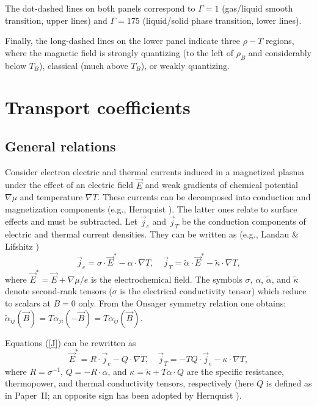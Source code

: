 \documentclass{aa}
\newcommand{\beq}{\begin{equation}}
\newcommand{\eeq}{\end{equation}}
\begin{document}
The dot-dashed lines on both panels correspond to
$\Gamma=1$ (gas/liquid smooth transition, upper lines)
and $\Gamma=175$ (liquid/solid phase transition, lower lines).

Finally, the long-dashed lines on
the lower panel indicate three $\rho-T$ regions,
where the magnetic field is strongly quantizing
(to the left of $\rho_B$ and considerably below $T_B$),
classical (much above $T_B$),
or weakly quantizing.

%
\section{Transport coefficients}
\label{sect-transp}
\subsection{General relations}
%
Consider electron electric and thermal currents
induced in a magnetized plasma
under the effect of an electric field $\vec{E}$ and
weak gradients of chemical potential $\nabla\mu$
and temperature $\nabla T$. 
These currents can be decomposed into conduction
and magnetization components (e.g., Hernquist \cite{hern84}).
The latter ones relate to surface effects and
must be subtracted.
Let $\vec{j}_e$ and $\vec{j}_T$ be the conduction components of
electric and thermal current densities. They can be written as
(e.g., Landau \& Lifshitz \cite{LaLi-ED2})
\beq
   \vec{j}_e = \sigma\cdot\vec{E}^\ast - \alpha\cdot\nabla T,
\quad
\vec{j}_T = \tilde\alpha\cdot\vec{E}^\ast-\tilde\kappa\cdot\nabla T,
\label{J}
\eeq
where $\vec{E}^\ast = \vec{E}+\nabla\mu/e$
is the electrochemical field.
The symbols $\sigma$, $\alpha$, $\tilde\alpha$,
and $\tilde\kappa$ denote second-rank tensors
($\sigma$ is the electrical conductivity tensor)
which reduce to scalars at $B=0$ only.
From the Onsager symmetry relation one obtains:
$\tilde\alpha_{ij}(\vec{B})=T\alpha_{ji}(-\vec{B})=T\alpha_{ij}(\vec{B})$.

Equations (\ref{J}) can be rewritten as
\beq
   \vec{E}^\ast = R\cdot\vec{j}_e - Q\cdot\nabla T,
\quad
   \vec{j}_T = - T Q\cdot\vec{j}_e - \kappa\cdot\nabla T,
\eeq
where $R=\sigma^{-1}$, $Q=-R\cdot\alpha$, and
$\kappa = \tilde\kappa + T\alpha\cdot Q$
are the specific resistance, thermopower, and thermal conductivity
tensors, respectively (here $Q$ is defined
as in Paper~II; an opposite sign has been adopted by 
Hernquist \cite{hern84}).
\end{document}
